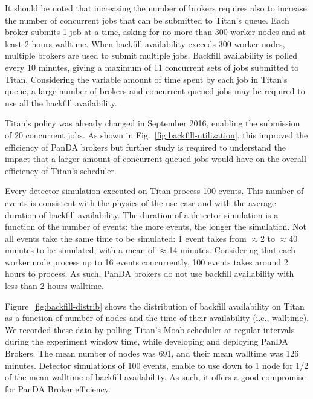 It should be noted that increasing the number of brokers requires also to
increase the number of concurrent jobs that can be submitted to Titan's queue.
Each broker submits 1 job at a time, asking for no more than 300 worker nodes
and at least 2 hours walltime. When backfill availability exceeds 300 worker
nodes, multiple brokers are used to submit multiple jobs. Backfill availability
is polled every 10 minutes, giving a maximum of 11 concurrent sets of jobs
submitted to Titan. Considering the variable amount of time spent by each job in
Titan's queue, a large number of brokers and concurrent queued jobs may be
required to use all the backfill availability.

Titan's policy was already changed in September 2016, enabling the submission of
20 concurrent jobs. As shown in Fig.~\ref{fig:backfill-utilization}, this
improved the efficiency of PanDA brokers but further study is required to
understand the impact that a larger amount of concurrent queued jobs would have
on the overall efficiency of Titan's scheduler.

Every detector simulation executed on Titan process 100 events. This number of
events is consistent with the physics of the use case and with the average
duration of backfill availability. The duration of a detector simulation is a
function of the number of events: the more events, the longer the simulation.
Not all events take the same time to be simulated:
1 event takes from $\approx$2 to $\approx$40 minutes to be simulated, with a
mean of $\approx$14 minutes. Considering that each worker node process up to 16
events concurrently, 100 events takes around 2 hours to process. As such, PanDA brokers do not use backfill availability with less than 2 hours walltime.


Figure~\ref{fig:backfill-distrib} shows the distribution of backfill
availability on Titan as a function of number of nodes and the time of their
availability (i.e., walltime). We recorded these data by polling Titan's Moab
scheduler at regular intervals during the experiment window time, while
developing and deploying PanDA Brokers. The mean number of nodes was 691, and
their mean walltime was 126 minutes. Detector simulations of 100 events, enable
to use down to 1 node for 1/2 of the mean walltime of backfill availability. As
such, it offers a good compromise for PanDA Broker efficiency.

